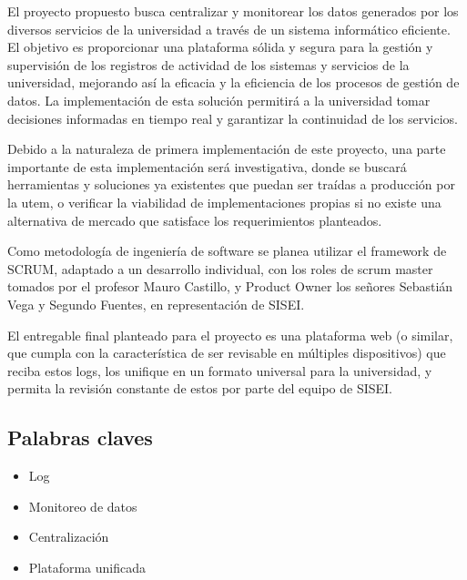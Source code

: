 \documentclass[
	spanish, %
	letterpaper, oneside
]{article}
\begin{document}
\templatePortrait

\templatePagecfg

\begin{abstractd}
	El proyecto propuesto busca centralizar y monitorear los datos generados por los diversos servicios de la universidad a través de un sistema informático eficiente. El objetivo es proporcionar una plataforma sólida y segura para la gestión y supervisión de los registros de actividad de los sistemas y servicios de la universidad, mejorando así la eficacia y la eficiencia de los procesos de gestión de datos. La implementación de esta solución permitirá a la universidad tomar decisiones informadas en tiempo real y garantizar la continuidad de los servicios.

	Debido a la naturaleza de primera implementación de este proyecto, una parte importante de esta implementación será investigativa, donde se buscará herramientas y soluciones ya existentes que puedan ser traídas a producción por la utem, o verificar la viabilidad de implementaciones propias si no existe una alternativa de mercado que satisface los requerimientos planteados.

	Como metodología de ingeniería de software se planea utilizar el framework de SCRUM, adaptado a un desarrollo individual, con los roles de scrum master tomados por el profesor Mauro Castillo, y Product Owner los señores Sebastián Vega y Segundo Fuentes, en representación de SISEI.

	El entregable final planteado para el proyecto es una plataforma web (o similar, que cumpla con la característica de ser revisable en múltiples dispositivos) que reciba estos logs, los unifique en un formato universal para la universidad, y permita la revisión constante de estos por parte del equipo de SISEI.

	\subsection*{Palabras claves}
	\begin{itemize}
		\item Log
		\item Monitoreo de datos
		\item Centralización
		\item Plataforma unificada
	\end{itemize}
\end{abstractd}

\templateIndex

\templateFinalcfg








\nocite{alberdi_2020}
\nocite{sharif_2022}
\nocite{schwaber2020scrum}



\end{document}
